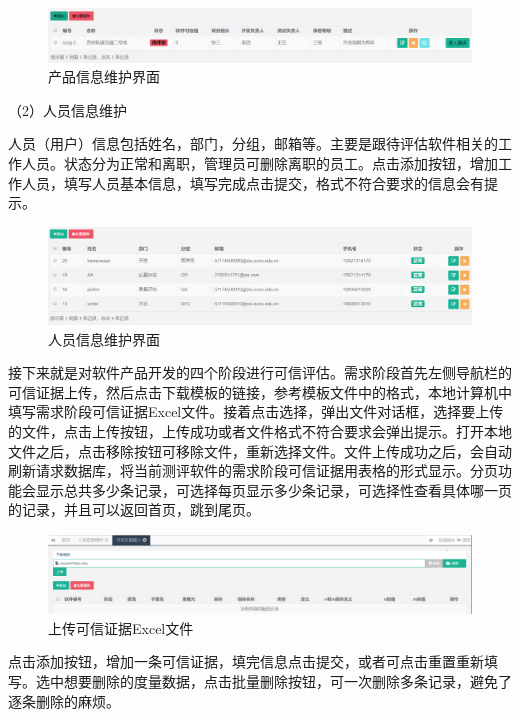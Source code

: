 \begin{figure}[htb]
	\centering
	\includegraphics[width=13cm]{fig/sy5_13.png}
	\caption{产品信息维护界面}
	\label{fig:5_13}
\end{figure}

（2）人员信息维护

人员（用户）信息包括姓名，部门，分组，邮箱等。主要是跟待评估软件相关的工作人员。状态分为正常和离职，管理员可删除离职的员工。点击添加按钮，增加工作人员，填写人员基本信息，填写完成点击提交，格式不符合要求的信息会有提示。
\begin{figure}[htb]
	\centering
	\includegraphics[width=13cm]{fig/5_05.png}
	\caption{人员信息维护界面}
	\label{fig:5_14}
\end{figure}

接下来就是对软件产品开发的四个阶段进行可信评估。需求阶段首先左侧导航栏的可信证据上传，然后点击下载模板的链接，参考模板文件中的格式，本地计算机中填写需求阶段可信证据Excel文件。接着点击选择，弹出文件对话框，选择要上传的文件，点击上传按钮，上传成功或者文件格式不符合要求会弹出提示。打开本地文件之后，点击移除按钮可移除文件，重新选择文件。文件上传成功之后，会自动刷新请求数据库，将当前测评软件的需求阶段可信证据用表格的形式显示。分页功能会显示总共多少条记录，可选择每页显示多少条记录，可选择性查看具体哪一页的记录，并且可以返回首页，跳到尾页。
\begin{figure}[htb]
	\centering
	\includegraphics[width=13cm]{fig/sy5_15.png}
	\caption{上传可信证据Excel文件}
	\label{fig:5_15}
\end{figure}

点击添加按钮，增加一条可信证据，填完信息点击提交，或者可点击重置重新填写。选中想要删除的度量数据，点击批量删除按钮，可一次删除多条记录，避免了逐条删除的麻烦。

